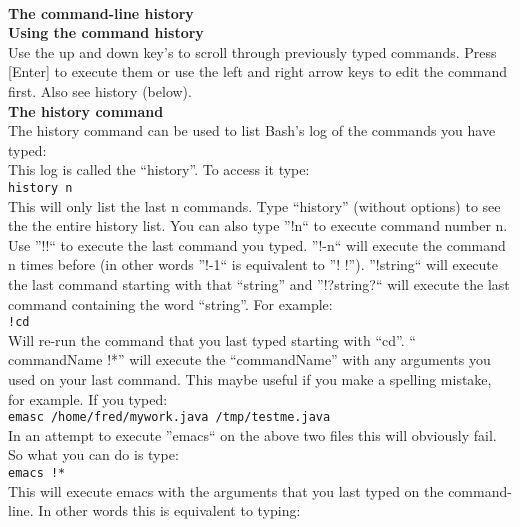 \documentclass[a4paper,11pt,spanish]{article} %
\begin{document}
\cite{serverschool}\\

\textbf{The command-line history}\\

\textbf{Using the command history}\\
Use the up and down key's to scroll through previously typed commands. 
Press [Enter] to execute them or use the left and right arrow keys to edit the command first.
Also see history (below).\\

\textbf{The history command}\\
The history command can be used to list Bash's log of the commands you have typed:\\

This log is called the “history”. To access it type:\\

\texttt{history n}\\

This will only list the last n commands. Type “history” (without options) to see the the entire history list.
You can also type ''!n`` to execute command number n. Use ''!!`` to execute the last command you typed.
''!-n`` will execute the command n times before (in other words ''!-1`` is equivalent to ''! !'').
''!string`` will execute the last command starting with that “string” and ''!?string?``
will execute the last command containing the word “string”. For example:\\

\texttt{!cd}\\

Will re-run the command that you last typed starting with “cd”.
“ commandName !*” will execute the “commandName” with any arguments you used on your last command.
This maybe useful if you make a spelling mistake, for example. If you typed:\\

\texttt{emasc /home/fred/mywork.java /tmp/testme.java}\\

In an attempt to execute ''emacs`` on the above two files this will obviously fail. 
So what you can do is type:\\

\texttt{emacs !*}\\

This will execute emacs with the arguments that you last typed on the command-line. 
In other words this is equivalent to typing:\\
\end{document}
